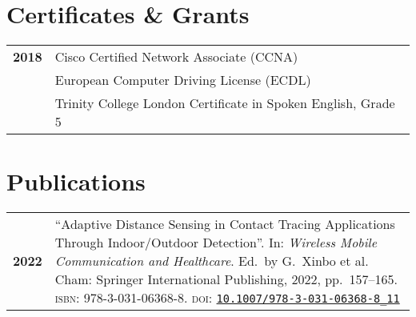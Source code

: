 \begin{paracol}{2}
\begin{minipage}[t]{0.32\textwidth}
		\section*{Certificates \& Grants}
		\begin{tabular}{>{\footnotesize\bfseries}r >{\footnotesize}p{}}
			2018 & Cisco Certified Network Associate (CCNA)\\\addlinespace[.25em]
			2011 & European Computer Driving License (ECDL)\\\addlinespace[.25em]
			2010 & Trinity College London Certificate in Spoken English, Grade 5
		\end{tabular}
		\vspace{3.4em}
		\section*{Publications}
		\begin{tabular}{>{\footnotesize\bfseries}r >{\footnotesize}p{}}
			2022 & ``Adaptive Distance Sensing in Contact Tracing
			     Applications Through Indoor/Outdoor Detection''.
			     In: \emph{Wireless Mobile Communication and
			     Healthcare}. Ed.~by G.~Xinbo et al. Cham: Springer
			     International Publishing, 2022, pp.~157--165.
			     \textsc{isbn}: 978-3-031-06368-8. \textsc{doi}:
			     \href{https://doi.org/10.1007/978-3-031-06368-8_11}{\texttt{10.1007/978-3-031-06368-8\_11}}
		\end{tabular}
	\end{minipage}
	\vspace{-1em}


\end{paracol}

